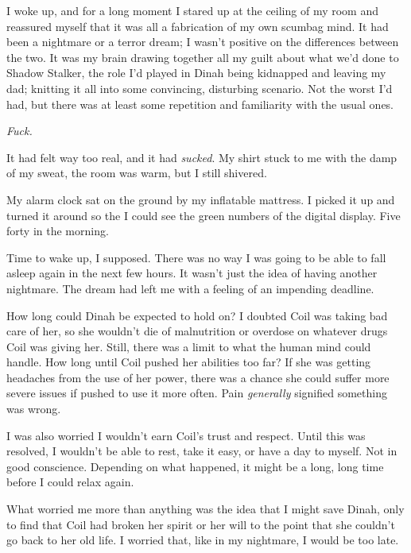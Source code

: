 \blacksquare



I woke up, and for a long moment I stared up at the ceiling of my room and reassured myself that it was all a fabrication of my own scumbag mind.  It had been a nightmare or a terror dream; I wasn't positive on the differences between the two.  It was my brain drawing together all my guilt about what we'd done to Shadow Stalker, the role I'd played in Dinah being kidnapped and leaving my dad; knitting it all into some convincing, disturbing scenario.  Not the worst I'd had, but there was at least some repetition and familiarity with the usual ones.



\emph{Fuck.}



It had felt way too real, and it had \emph{sucked}.  My shirt stuck to me with the damp of my sweat, the room was warm, but I still shivered.



My alarm clock sat on the ground by my inflatable mattress.  I picked it up and turned it around so the I could see the green numbers of the digital display.  Five forty in the morning.



Time to wake up, I supposed.  There was no way I was going to be able to fall asleep again in the next few hours.  It wasn't just the idea of having another nightmare.  The dream had left me with a feeling of an impending deadline.



How long could Dinah be expected to hold on?  I doubted Coil was taking bad care of her, so she wouldn't die of malnutrition or overdose on whatever drugs Coil was giving her.  Still, there was a limit to what the human mind could handle.  How long until Coil pushed her abilities too far?  If she was getting headaches from the use of her power, there was a chance she could suffer more severe issues if pushed to use it more often.  Pain \emph{generally} signified something was wrong.



I was also worried I wouldn't earn Coil's trust and respect.  Until this was resolved, I wouldn't be able to rest, take it easy, or have a day to myself.  Not in good conscience.  Depending on what happened, it might be a long, long time before I could relax again.



What worried me more than anything was the idea that I might save Dinah, only to find that Coil had broken her spirit or her will to the point that she couldn't go back to her old life.  I worried that, like in my nightmare, I would be too late.



